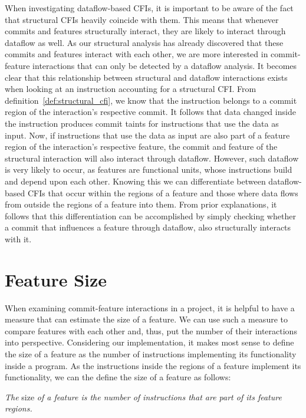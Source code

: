 When investigating dataflow-based CFIs, it is important to be aware of the fact that structural CFIs heavily coincide with them.
This means that whenever commits and features structurally interact, they are likely to interact through dataflow as well.
As our structural analysis has already discovered that these commits and features interact with each other, 
we are more interested in commit-feature interactions that can only be detected by a dataflow analysis.
It becomes clear that this relationship between structural and dataflow interactions exists when looking at an instruction accounting for a structural CFI.
From definition~\ref{def:structural_cfi}, we know that the instruction belongs to a commit region of the interaction's respective commit.
It follows that data changed inside the instruction produces commit taints for instructions that use the data as input. 
Now, if instructions that use the data as input are also part of a feature region of the interaction's respective feature, the commit and feature of the structural interaction will also interact through dataflow.
However, such dataflow is very likely to occur, as features are functional units, whose instructions build and depend upon each other. 
Knowing this we can differentiate between dataflow-based CFIs that occur within the regions of a feature and those where data flows from outside the regions of a feature into them.
From prior explanations, it follows that this differentiation can be accomplished by simply checking whether a commit that influences a feature through dataflow, also structurally interacts with it. 

\section{Feature Size}\label{sec:feature_size}

When examining commit-feature interactions in a project, it is helpful to have a measure that can estimate the size of a feature.
We can use such a measure to compare features with each other and, thus, put the number of their interactions into perspective.
Considering our implementation, it makes most sense to define the size of a feature as the number of instructions implementing its functionality inside a program.
As the instructions inside the regions of a feature implement its functionality, we can the define the size of a feature as follows:
\begin{definition} \label{def:feature_size}
\emph{The} size \emph{of a feature is the number of instructions that are part of its feature regions.}
\end{definition}

